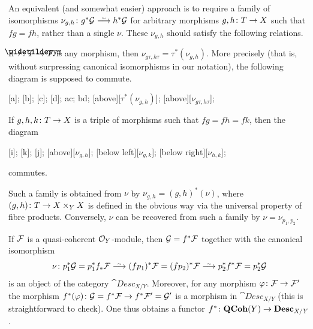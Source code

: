 \documentclass[a4paper,parskip=half,numbers=enddot, DIV=12]{scrreprt}
\begin{document}
\begin{rem}
	An equivalent (and somewhat easier) approach is to require a family of isomorphisms $\nu_{g,h}\colon g^*\Gg\isomorphism h^*\Gg$ for arbitrary morphisms $g,h\colon T\morphism X$ such that $fg=fh$, rather than a single $\nu$. These $\nu_{g,h}$ should satisfy the following relations.
		\begin{alphanumerate}
			\item If $\tau\colon \snake{T}\morphism T$ is any morphism, then $\nu_{g\tau,h\tau}=\tau^*(\nu_{g,h})$. More precisely (that is, without surpressing canonical isomorphisms in our notation), the following diagram is supposed to commute.
			\begin{diagram*}
				[a];
				[b];
				[c];
				[d];
				\scriptsize
				\isoarrow ac;
				\isoarrow bd;
				[above][$\tau^*(\nu_{g,h})$];
				[above][$\nu_{g\tau,h\tau}$];
			\end{diagram*}
			\item If $g,h,k\colon T\morphism X$ is a triple of morphisms such that $fg=fh=fk$, then the diagram
			\begin{diagram*}
				\object{0,1.25}{$g^*\Gg$}[i];
				\object{1.25,0}{$h^*\Gg$}[k];
				\object{2.5,1.25}{$k^*\Gg$}[j];
				\scriptsize
				[above][$\nu_{g,h}$];
				[$\nu_{g,k}$];
				[below right][$\nu_{h,k}$];
			\end{diagram*}
			commutes.
		\end{alphanumerate}
		Such a family is obtained from $\nu$ by $\nu_{g,h}=(g,h)^*(\nu)$, where $(g,h)\colon T\morphism X\times_YX$ is defined in the obvious way via the universal property of fibre products. Conversely, $\nu$ can be recovered from such a family by $\nu=\nu_{ p_1, p_2}$.
\end{rem}
\begin{rem}
	If $\mathcal{F}$ is a quasi-coherent $\mathcal{O}_Y$-module, then $\mathcal{G}=f^*\mathcal{F}$ together with the canonical isomorphism
	\begin{align*}
		\nu\colon  p_1^*\Gg= p_1^*f_*\Ff\isomorphism (f p_1)^*\Ff=(f p_2)^*\Ff\isomorphism  p_2^*f^*\Ff= p_2^*\Gg
	\end{align*}
	is an object of the category $\cat{Desc}_{X/Y}$. Moreover, for any morphism $\phi\colon \Ff\morphism \Ff'$ the morphism $f^*(\phi)\colon \Gg=f^*\Ff\morphism f^*\Ff'=\Gg'$ is a morphism in $\cat{Desc}_{X/Y}$ (this is straightforward to check). One thus obtains a functor $f^*\colon\cat{QCoh}(Y)\morphism \cat{Desc}_{X/Y}$.
\end{rem}
\end{document}
